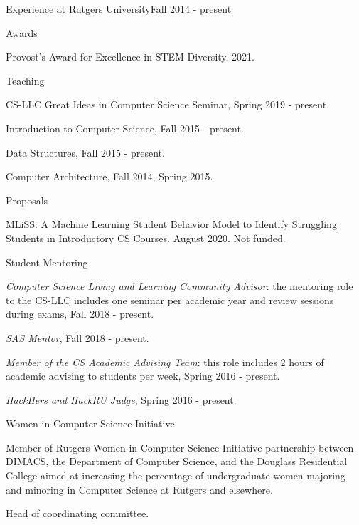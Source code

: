 \documentclass{resume}
\begin{document}
  
  \begin{rSection}{Experience at Rutgers University}{Fall 2014 - present}{}

  \begin{rSubsection}{Awards}{}{}{}
	\item Provost's Award for Excellence in STEM Diversity, 2021.
 \end{rSubsection}

  \begin{rSubsection}{Teaching}{}{}{}
    \item CS-LLC Great Ideas in Computer Science Seminar, Spring 2019 - present.
    \item Introduction to Computer Science, Fall 2015 - present.
    \item Data Structures, Fall 2015 - present.
    \item Computer Architecture, Fall 2014, Spring 2015.
  \end{rSubsection}

  \begin{rSubsection}{Proposals}{}{}{}
    \item MLiSS: A Machine Learning Student Behavior Model to Identify
      Struggling Students in Introductory CS Courses. August 2020. Not funded.
  \end{rSubsection}
  
  \begin{rSubsection}{Student Mentoring}{}{}{}
    \item {\em Computer Science Living and Learning Community Advisor}: the
      mentoring role to the CS-LLC includes one seminar per academic
      year and review sessions during exams, Fall 2018 - present.
    \item {\em SAS Mentor}, Fall 2018 - present.
    \item {\em Member of the CS Academic Advising Team}: this role
      includes 2 hours of academic advising to students per week,
      Spring 2016 - present.
    \item {\em HackHers and HackRU Judge}, Spring 2016 - present.
    \end{rSubsection}

     \begin{rSubsection}{Women in Computer Science Initiative}{}{}{}
    \item Member of Rutgers Women in Computer Science Initiative partnership
      between DIMACS, the Department of Computer Science, and the
      Douglass Residential College aimed at increasing the percentage of
      undergraduate women majoring and minoring in Computer Science at
      Rutgers and elsewhere.
    \item Head of coordinating committee.
     \end{rSubsection}
    

\end{rSection}
\end{document}
